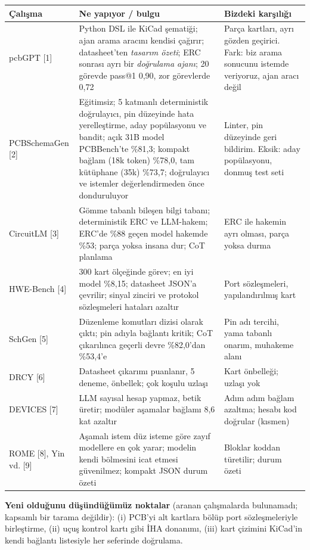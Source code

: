 \documentclass[11pt,a4paper]{article}
\begin{document}
\begin{longtable}{@{}p{3.1cm}p{6.6cm}p{6.2cm}@{}}
\toprule \textbf{Çalışma} & \textbf{Ne yapıyor / bulgu} & \textbf{Bizdeki karşılığı} \\ \midrule \endhead
pcbGPT [1] & Python DSL ile KiCad şematiği; ajan arama aracını kendisi çağırır; datasheet'ten \emph{tasarım özeti}; ERC sonrası ayrı bir \emph{doğrulama ajanı}; 20 görevde pass@1 0,90, zor görevlerde 0,72 & Parça kartları, ayrı gözden geçirici. Fark: biz arama sonucunu istemde veriyoruz, ajan aracı değil \\
PCBSchemaGen [2] & Eğitimsiz; 5 katmanlı deterministik doğrulayıcı, pin düzeyinde hata yerelleştirme, aday popülasyonu ve bandit; açık 31B model PCBBench'te \%81,3; kompakt bağlam (18k token) \%78,0, tam kütüphane (35k) \%73,7; doğrulayıcı ve istemler değerlendirmeden önce donduruluyor & Linter, pin düzeyinde geri bildirim. Eksik: aday popülasyonu, donmuş test seti \\
CircuitLM [3] & Gömme tabanlı bileşen bilgi tabanı; deterministik ERC ve LLM-hakem; ERC'de \%88 geçen model hakemde \%53; parça yoksa insana dur; CoT planlama & ERC ile hakemin ayrı olması, parça yoksa durma \\
HWE-Bench [4] & 300 kart ölçeğinde görev; en iyi model \%8,15; datasheet JSON'a çevrilir; sinyal zinciri ve protokol sözleşmeleri hataları azaltır & Port sözleşmeleri, yapılandırılmış kart \\
SchGen [5] & Düzenleme komutları dizisi olarak çıktı; pin adıyla bağlantı kritik; CoT çıkarılınca geçerli devre \%82,0'dan \%53,4'e & Pin adı tercihi, yama tabanlı onarım, muhakeme alanı \\
DRCY [6] & Datasheet çıkarımı puanlanır, 5 deneme, önbellek; çok koşulu uzlaşı & Kart önbelleği; uzlaşı yok \\
DEVICES [7] & LLM sayısal hesap yapmaz, betik üretir; modüler aşamalar bağlamı 8,6 kat azaltır & Adım adım bağlam azaltma; hesabı kod doğrular (kısmen) \\
ROME [8], Yin vd. [9] & Aşamalı istem düz isteme göre zayıf modellere en çok yarar; modelin kendi bölmesini icat etmesi güvenilmez; kompakt JSON durum özeti & Bloklar koddan türetilir; durum özeti \\ \bottomrule
\end{longtable}

\textbf{Yeni olduğunu düşündüğümüz noktalar} (aranan çalışmalarda bulunamadı; kapsamlı bir tarama değildir): (i) PCB'yi alt kartlara bölüp port sözleşmeleriyle birleştirme, (ii) uçuş kontrol kartı gibi İHA donanımı, (iii) kart çizimini KiCad'in kendi bağlantı listesiyle her seferinde doğrulama.
\end{document}
